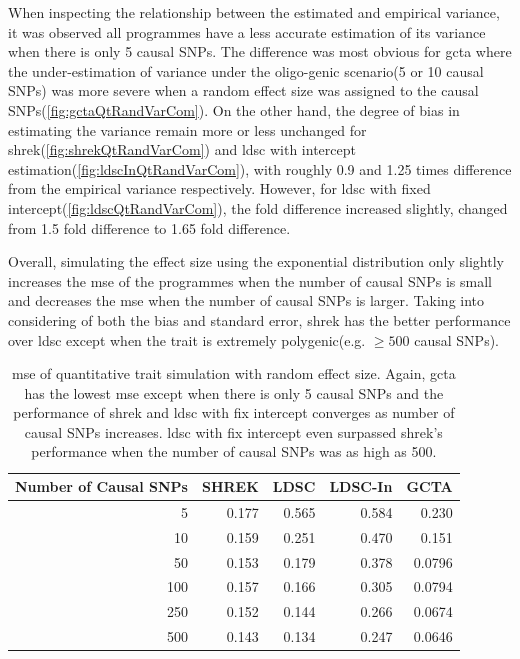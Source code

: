 		When inspecting the relationship between the estimated and empirical variance, it was observed all programmes have a less accurate estimation of its variance when there is only 5 causal \glspl{SNP}. 
		The difference was most obvious for \gls{gcta} where the under-estimation of variance under the oligo-genic scenario(5 or 10 causal \glspl{SNP}) was more severe when a random effect size was assigned to the causal \glspl{SNP}(\cref{fig:gctaQtRandVarCom}).    
		On the other hand, the degree of bias in estimating the variance remain more or less unchanged for \gls{shrek}(\cref{fig:shrekQtRandVarCom}) and \gls{ldsc} with intercept estimation(\cref{fig:ldscInQtRandVarCom}), with roughly 0.9 and 1.25 times difference from the empirical variance respectively.
		However, for \gls{ldsc} with fixed intercept(\cref{fig:ldscQtRandVarCom}), the fold difference increased slightly, changed from 1.5 fold difference to 1.65 fold difference.
		
		Overall, simulating the effect size using the exponential distribution only slightly increases the \gls{mse} of the programmes when the number of causal \glspl{SNP} is small and decreases the \gls{mse} when the number of causal \glspl{SNP} is larger. 
		Taking into considering of both the bias and standard error, \gls{shrek} has the better performance over \gls{ldsc} except when the trait is extremely polygenic(e.g. $\ge500$ causal \glspl{SNP}).
		\begin{table}
			\centering
			\begin{tabular}{rrrrr}
				\toprule
				Number of Causal SNPs&	SHREK&	LDSC&	LDSC-In&	GCTA \\
				\midrule
				5	&	0.177	&	0.565	&	0.584	&	0.230\\
				10	&	0.159	&	0.251	&	0.470	&	0.151\\
				50	&	0.153	&	0.179	&	0.378	&	0.0796\\
				100	&	0.157	&	0.166	&	0.305	&	0.0794\\
				250	&	0.152	&	0.144	&	0.266	&	0.0674\\
				500	&	0.143	&	0.134	&	0.247	&	0.0646\\
				\bottomrule
			\end{tabular}
			\caption[Mean Squared Error of Quantitative Trait Simulation with Random Effect Size]{
				\gls{mse} of quantitative trait simulation with random effect size.
				Again, \gls{gcta} has the lowest \gls{mse} except when there is only 5 causal \glspl{SNP} and the performance of \gls{shrek} and \gls{ldsc} with fix intercept converges as number of causal \glspl{SNP} increases. 
				\gls{ldsc} with fix intercept even surpassed \gls{shrek}'s performance when the number of causal \glspl{SNP} was as high as 500.}
			\label{tab:mseQtRandom}
		\end{table}
